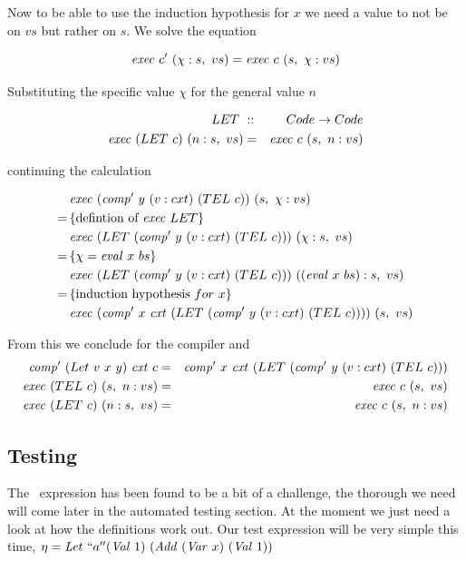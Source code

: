 \documentclass {article}
\begin{document}
Now to be able to use the induction hypothesis for $x$
we need a value to not be on $vs$ but rather on $s$.
We solve the equation 

\[ \Exec c'\ (\chi : s,\ vs) = \Exec c\ (s,\ \chi : vs) \]

Substituting the specific value $\chi$ for the general value $n$

\begin{eqnarray*}
 	LET\ &::&\ Code \rightarrow Code \\
 	\mathit{exec\ } (LET\ c)\ (n:s,\ vs) &=& \mathit{exec\ } c\ (s,\ n:vs)
\end{eqnarray*}

continuing the calculation

\begin{align*}
&\Exec (\Compp  y\ (v:cxt)\ (TEL\ c))\ (s,\ \chi : vs) \\
=\, & \{\mbox{defintion of}\ \Exec LET\} \\
&\Exec (LET\ (\Compp  y\ (v:cxt)\ (TEL\ c)))\ (\chi : s,\ vs)\\
=\, & \{ \chi = \evalf  x\ bs \} \\
&\Exec (LET\ (\Compp  y\ (v:cxt)\ (TEL\ c)))\ ((\evalf  x\ bs) : s,\ vs)\\
=\, & \{ \mbox{induction hypothesis}\ for\ x \} \\
&\Exec (\Compp  x\ \cxtm (LET\ (\Compp  y\ (v:cxt)\ (TEL\ c))))\ (s,\ vs)
\end{align*}

From this we conclude for the compiler and \vm
\begin{eqnarray*}
\Compp  (Let\ v\ x\ y)\ \cxtm c
		&=& \Compp  x\ \cxtm (LET\ (\Compp  y\ (v:cxt)\ (TEL\ c))) \\
\Exec (TEL\ c)\ (s,\ n:vs) &=& \Exec c\ (s,\ vs) \\
\Exec (LET\ c)\ (n:s,\ vs) &=& \Exec c\ (s,\ n:vs) \\
\end{eqnarray*}


\subsection{Testing}

The \leet\ expression has been found to be
a bit of a challenge, the thorough we need 
will come later in the automated testing section.
At the moment we just need a look at how the definitions
work out.
Our test expression will be very simple this time,
\( \eta = \mathit{Let\ } ``a'' (\mathit{Val\ } 1)\ (\mathit{Add\ } (\mathit{Var\ } x)\ (\mathit{Val\ } 1)) \) 
\end{document}
